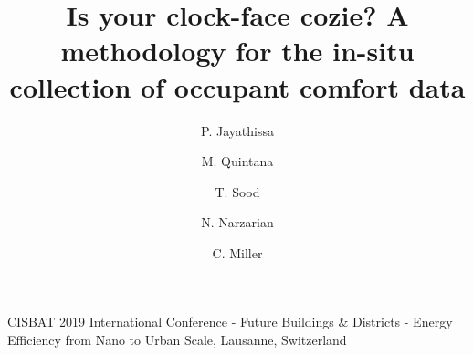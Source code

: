 \documentclass[preprint,11pt,3p]{elsarticle} %
\begin{document}
\begin{frontmatter}


\begin{center}
{CISBAT 2019 International Conference - Future Buildings \& Districts - Energy Efficiency from Nano to Urban Scale, Lausanne, Switzerland}
\end{center}

\title{Is your clock-face cozie? A methodology for the in-situ collection of occupant comfort data} 


\author[buds]{P. Jayathissa}
\address[buds]{Building and Urban Data Science Group,  Department of Building, Singapore} 

\author[buds]{M. Quintana}

\author[buds]{T. Sood}


\author[unsw]{N. Narzarian}
\address[unsw]{University of New South Wales, Australia}



\author[buds]{C. Miller  }




\begin{abstract}



\end{abstract}
\end{frontmatter}
\end{document}
